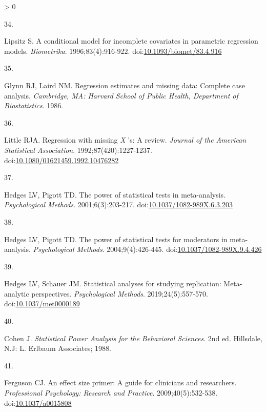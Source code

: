 \documentclass[
]{article}
\newlength{\cslhangindent}
\newlength{\csllabelwidth}
\newenvironment{CSLReferences}[2] %
 {%
  \setlength{\parindent}{0pt}
  \ifodd #1 \everypar{\setlength{\hangindent}{\cslhangindent}}\ignorespaces\fi
  \ifnum #2 > 0
  \setlength{\parskip}{#2\baselineskip}
  \fi
 }%
 {}
\newcommand{\CSLLeftMargin}[1]{\parbox[t]{\csllabelwidth}{#1}}
\newcommand{\CSLRightInline}[1]{\parbox[t]{\linewidth - \csllabelwidth}{#1}\break}
\begin{document}
\begin{CSLReferences}{0}{0}
\leavevmode\hypertarget{ref-lipsitzConditionalModelIncomplete1996}{}%
\CSLLeftMargin{34. }
\CSLRightInline{Lipsitz S. A conditional model for incomplete covariates in parametric regression models. \emph{Biometrika}. 1996;83(4):916-922. doi:\href{https://doi.org/10.1093/biomet/83.4.916}{10.1093/biomet/83.4.916}}

\leavevmode\hypertarget{ref-glynnRegressionEstimatesMissing1986}{}%
\CSLLeftMargin{35. }
\CSLRightInline{Glynn RJ, Laird NM. Regression estimates and missing data: Complete case analysis. \emph{Cambridge, MA: Harvard School of Public Health, Department of Biostatistics}. 1986.}

\leavevmode\hypertarget{ref-littleRegressionMissingReview1992}{}%
\CSLLeftMargin{36. }
\CSLRightInline{Little RJA. Regression with missing \emph{X} 's: A review. \emph{Journal of the American Statistical Association}. 1992;87(420):1227-1237. doi:\href{https://doi.org/10.1080/01621459.1992.10476282}{10.1080/01621459.1992.10476282}}

\leavevmode\hypertarget{ref-hedgesPowerStatisticalTests2001}{}%
\CSLLeftMargin{37. }
\CSLRightInline{Hedges LV, Pigott TD. The power of statistical tests in meta-analysis. \emph{Psychological Methods}. 2001;6(3):203-217. doi:\href{https://doi.org/10.1037/1082-989X.6.3.203}{10.1037/1082-989X.6.3.203}}

\leavevmode\hypertarget{ref-hedgesPowerStatisticalTests2004}{}%
\CSLLeftMargin{38. }
\CSLRightInline{Hedges LV, Pigott TD. The power of statistical tests for moderators in meta-analysis. \emph{Psychological Methods}. 2004;9(4):426-445. doi:\href{https://doi.org/10.1037/1082-989X.9.4.426}{10.1037/1082-989X.9.4.426}}

\leavevmode\hypertarget{ref-hedgesStatisticalAnalysesStudying2019}{}%
\CSLLeftMargin{39. }
\CSLRightInline{Hedges LV, Schauer JM. Statistical analyses for studying replication: Meta-analytic perspectives. \emph{Psychological Methods}. 2019;24(5):557-570. doi:\href{https://doi.org/10.1037/met0000189}{10.1037/met0000189}}

\leavevmode\hypertarget{ref-cohenStatisticalPowerAnalysis1988}{}%
\CSLLeftMargin{40. }
\CSLRightInline{Cohen J. \emph{Statistical Power Analysis for the Behavioral Sciences}. 2nd ed. Hillsdale, N.J: L. Erlbaum Associates; 1988.}

\leavevmode\hypertarget{ref-fergusonEffectSizePrimer2009}{}%
\CSLLeftMargin{41. }
\CSLRightInline{Ferguson CJ. An effect size primer: A guide for clinicians and researchers. \emph{Professional Psychology: Research and Practice}. 2009;40(5):532-538. doi:\href{https://doi.org/10.1037/a0015808}{10.1037/a0015808}}


\end{CSLReferences}
\end{document}
